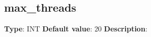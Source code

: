 \subsection*{max_threads}
\textbf{Type}: INT\newline
\textbf{Default value}: 20\newline
\textbf{Description}: